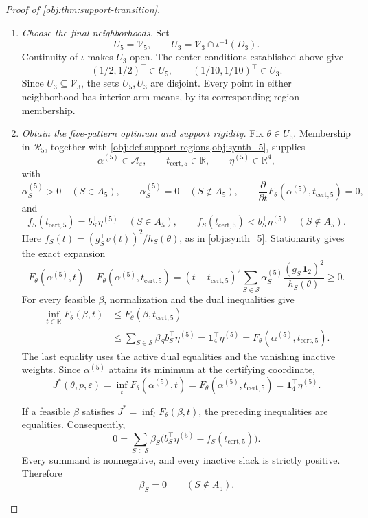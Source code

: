 \begin{proof}[Proof of \cref{obj:thm:support-transition}]
\begin{enumerate}
\item \emph{Choose the final neighborhoods.}
Set
\[
U_5=\mathcal V_5,
\qquad
U_3=\mathcal V_3\cap\iota^{-1}(D_3).
\]
Continuity of \(\iota\) makes \(U_3\) open. The center conditions established above give
\[
(1/2,1/2)^\top\in U_5,
\qquad
(1/10,1/10)^\top\in U_3.
\]
Since \(U_3\subseteq\mathcal V_3\), the sets \(U_5,U_3\) are disjoint. Every point in either neighborhood has interior arm means, by its corresponding region membership.

\item \emph{Obtain the five-pattern optimum and support rigidity.}
Fix \(\theta\in U_5\). Membership in \(\mathcal R_5\), together with
\cref{obj:def:support-regions,obj:synth_5}, supplies
\[
\alpha^{(5)}\in\mathcal A_\varepsilon,\qquad
t_{\mathrm{cert},5}\in\mathbb R,\qquad
\eta^{(5)}\in\mathbb R^4,
\]
with
\[
\alpha^{(5)}_S>0\quad(S\in A_5),\qquad
\alpha^{(5)}_S=0\quad(S\notin A_5),
\qquad
\frac{\partial}{\partial t}
F_\theta(\alpha^{(5)},t_{\mathrm{cert},5})=0,
\]
and
\[
f_S(t_{\mathrm{cert},5})=
 b_S^\top\eta^{(5)}\quad(S\in A_5),
\qquad
f_S(t_{\mathrm{cert},5})<
 b_S^\top\eta^{(5)}\quad(S\notin A_5).
\]
Here \(f_S(t)=(g_S^\top v(t))^2/h_S(\theta)\), as in
\cref{obj:synth_5}. Stationarity gives the exact expansion
\[
F_\theta(\alpha^{(5)},t)-F_\theta(\alpha^{(5)},t_{\mathrm{cert},5})
=(t-t_{\mathrm{cert},5})^2
 \sum_{S\in\mathcal S}
 \alpha^{(5)}_S\frac{(g_S^\top\mathbf1_2)^2}{h_S(\theta)}
\ge0.
\]
For every feasible \(\beta\), normalization and the dual inequalities give
\[
\begin{aligned}
\inf_{t\in\mathbb R}F_\theta(\beta,t)
&\le F_\theta(\beta,t_{\mathrm{cert},5})\\
&\le\sum_{S\in\mathcal S}\beta_S b_S^\top\eta^{(5)}
=\mathbf1_4^\top\eta^{(5)}
=F_\theta(\alpha^{(5)},t_{\mathrm{cert},5}).
\end{aligned}
\]
The last equality uses the active dual equalities and the vanishing inactive weights. Since \(\alpha^{(5)}\) attains its minimum at the certifying coordinate,
\[
J^*(\theta,p,\varepsilon)
=\inf_tF_\theta(\alpha^{(5)},t)
=F_\theta(\alpha^{(5)},t_{\mathrm{cert},5})
=\mathbf1_4^\top\eta^{(5)}.
\]

If a feasible \(\beta\) satisfies \(J^*=\inf_tF_\theta(\beta,t)\), the preceding inequalities are equalities. Consequently,
\[
0=\sum_{S\in\mathcal S}\beta_S
 \bigl(b_S^\top\eta^{(5)}-f_S(t_{\mathrm{cert},5})\bigr).
\]
Every summand is nonnegative, and every inactive slack is strictly positive. Therefore
\[
\beta_S=0\qquad(S\notin A_5).
\]


\end{enumerate}
\end{proof}
